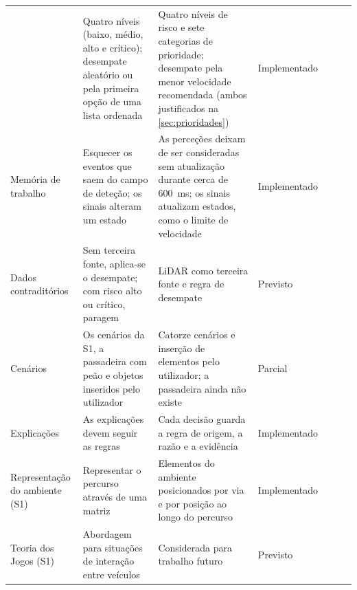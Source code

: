 \begin{table}[H]
\begin{tabularx}{\textwidth}{@{}L{2.3cm}V
      >{\raggedright\arraybackslash}XV
      >{\raggedright\arraybackslash}XV
      L{2.05cm}@{}}
      & Quatro níveis (baixo, médio, alto e crítico); desempate aleatório ou
        pela primeira opção de uma lista ordenada
      & Quatro níveis de risco e sete categorias de prioridade; desempate pela
        menor velocidade recomendada (ambos justificados na
        \cref{sec:prioridades})
      & Implementado \\ \linhasep
    Memória de trabalho
      & Esquecer os eventos que saem do campo de deteção; os sinais alteram um
        estado
      & As perceções deixam de ser consideradas sem atualização durante cerca
        de 600~ms; os sinais atualizam estados, como o limite de velocidade
      & Implementado \\ \linhasep
    Dados contraditórios
      & Sem terceira fonte, aplica-se o desempate; com risco alto ou crítico,
        paragem
      & LiDAR como terceira fonte e regra de desempate
      & Previsto \\ \linhasep
    Cenários
      & Os cenários da S1, a passadeira com peão e objetos inseridos pelo
        utilizador
      & Catorze cenários e inserção de elementos pelo utilizador; a passadeira
        ainda não existe
      & Parcial \\ \linhasep
    Explicações
      & As explicações devem seguir as regras
      & Cada decisão guarda a regra de origem, a razão e a evidência
      & Implementado \\ \linhasep
    Representação do ambiente (S1)
      & Representar o percurso através de uma matriz
      & Elementos do ambiente posicionados por via e por posição ao longo do
        percurso
      & Implementado \\ \linhasep
    Teoria dos Jogos (S1)
      & Abordagem para situações de interação entre veículos
      & Considerada para trabalho futuro
      & Previsto \\
    \bottomrule
  \end{tabularx}
\end{table}
\fi

